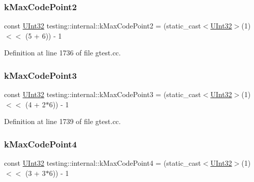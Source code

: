 \subsubsection{\texorpdfstring{k\+Max\+Code\+Point2}{kMaxCodePoint2}}
{\footnotesize\ttfamily const \hyperlink{namespacetesting_1_1internal_a40d4fffcd2bf56f18b1c380615aa85e3}{U\+Int32} testing\+::internal\+::k\+Max\+Code\+Point2 = (static\+\_\+cast$<$\hyperlink{namespacetesting_1_1internal_a40d4fffcd2bf56f18b1c380615aa85e3}{U\+Int32}$>$(1) $<$$<$ (5 + 6)) -\/ 1}



Definition at line 1736 of file gtest.\+cc.

\mbox{\label{namespacetesting_1_1internal_aa42bd507418e570402996e33582beed3}} 
\subsubsection{\texorpdfstring{k\+Max\+Code\+Point3}{kMaxCodePoint3}}
{\footnotesize\ttfamily const \hyperlink{namespacetesting_1_1internal_a40d4fffcd2bf56f18b1c380615aa85e3}{U\+Int32} testing\+::internal\+::k\+Max\+Code\+Point3 = (static\+\_\+cast$<$\hyperlink{namespacetesting_1_1internal_a40d4fffcd2bf56f18b1c380615aa85e3}{U\+Int32}$>$(1) $<$$<$ (4 + 2$\ast$6)) -\/ 1}



Definition at line 1739 of file gtest.\+cc.

\mbox{\label{namespacetesting_1_1internal_acd87c60be9b5fedb2d017503d8834474}} 
\subsubsection{\texorpdfstring{k\+Max\+Code\+Point4}{kMaxCodePoint4}}
{\footnotesize\ttfamily const \hyperlink{namespacetesting_1_1internal_a40d4fffcd2bf56f18b1c380615aa85e3}{U\+Int32} testing\+::internal\+::k\+Max\+Code\+Point4 = (static\+\_\+cast$<$\hyperlink{namespacetesting_1_1internal_a40d4fffcd2bf56f18b1c380615aa85e3}{U\+Int32}$>$(1) $<$$<$ (3 + 3$\ast$6)) -\/ 1}



